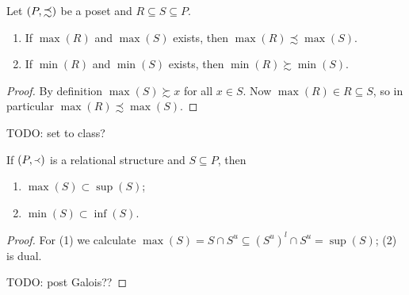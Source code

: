 \begin{lemma} \label{greatestLeastElementsSubsetPoset}
Let $\left( P, \precsim \right)$ be a poset and $R\subseteq S\subseteq P$.
\begin{enumerate}
\item If $\max(R)$ and $\max(S)$ exists, then $\max(R) \precsim \max(S)$.
\item If $\min(R)$ and $\min(S)$ exists, then $\min(R) \succsim \min(S)$.
\end{enumerate}
\end{lemma}
\begin{proof}
By definition $\max(S) \succsim x$ for all $x \in S$. Now $\max(R)\in R\subseteq S$, so in particular $\max(R) \precsim \max(S)$.
\end{proof}

TODO: set to class?
\begin{lemma} \label{maxSupMinInf}
If $\left( P, \Yleft \right)$ is a relational structure and $S\subseteq P$, then
\begin{enumerate}
\item $\max(S)\subset \sup(S)$;
\item $\min(S)\subset \inf(S)$.
\end{enumerate}
\end{lemma}
\begin{proof}
For (1) we calculate $\max(S) = S \cap S^u \subseteq (S^u)^l \cap S^u = \sup(S)$; (2) is dual.

TODO: post Galois??
\end{proof}

